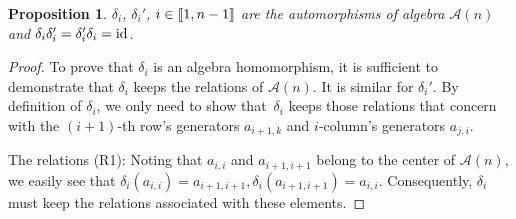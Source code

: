 \documentclass[pdftex]{sigma}
\numberwithin{equation}{section}
\def\id{{\rm id}}
\def\lrb#1{\left(#1\right)}
\def\d{\delta}
\def\A{\mathscr{A}}
\def\lbb#1{\left[\kern-0.15em\left[ {#1} \right] \kern-0.15em\right]}
\newtheorem{Proposition}[Theorem]{Proposition}
 { \theoremstyle{definition}
\newtheorem{Definition}[Theorem]{Definition}
\newtheorem{Note}[Theorem]{Note}
\newtheorem{Example}[Theorem]{Example}
\newtheorem{Remark}[Theorem]{Remark} }
\begin{document}
\begin{Proposition}
$\d_i$, $\d_i'$, $i \in \lbb{1,n-1}$ are the automorphisms of algebra $\A(n)$ and $\d_i\d_i'=\d_i'\d_i\allowbreak=\id$.
\end{Proposition}
\begin{proof}
To prove that $\d_i$ is an algebra homomorphism, it is sufficient to demonstrate that $\d_i$ keeps the relations of $\A(n).$
It is similar for $\d_i'$.
By definition of $\d_i$, we only need to show that~$\d_i$ keeps those relations that concern with the $(i+1)$-th row's generators $a_{i+1, k}$ and $i$-column's generators $a_{j,i}$.

The relations (R1):
Noting that $a_{i,i}$ and $a_{i+1,i+1}$ belong to the center of $\A(n)$, we easily see that
$\d_i\lrb{a_{i,i}}=a_{i+1,i+1}, \d_i\lrb{a_{i+1,i+1}}=a_{i,i}.$
 Consequently, $\d_i$ must keep the relations associated with these elements.


\end{proof}
\end{document}
